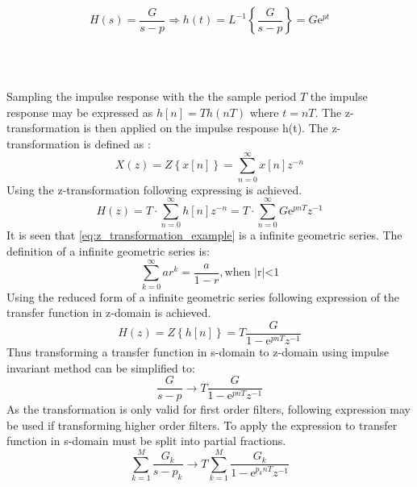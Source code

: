 \begin{equation}
H(s) = \frac{G}{s-p} \Rightarrow h(t) = L^{-1}\left\lbrace \frac{G}{s-p} \right\rbrace = G\text{e}^{pt}
\end{equation}
\begin{where}
\\
\\
\end{where}

Sampling the impulse response with the the sample period $T$ the impulse response may be expressed as $h[n] = Th(nT)$ where $t = nT$. The z-transformation is then applied on the impulse response h(t). The z-transformation is defined as \citep{Oppenheim}:
\begin{equation}
X(z) = Z \left\lbrace x[n] \right\rbrace = \sum_{n=0}^{\infty}x[n]z^{-n}
\end{equation}
Using the z-transformation following expressing is achieved.
\begin{equation} \label{eq:z_transformation_example}
H(z) = T\cdot \sum_{n=0}^{\infty}h[n]z^{-n} = T\cdot \sum_{n=0}^{\infty}G\text{e}^{pnT}z^{-1}
\end{equation}
It is seen that \autoref{eq:z_transformation_example} is a infinite geometric series. The definition of a infinite geometric series is:
\begin{equation} \label{eq:z_transformation_example}
\sum_{k=0}^{\infty}ar^k  = \frac{a}{1-r}, \text{when |r|<1}
\end{equation}
Using the reduced form of a infinite geometric series following expression of the transfer function in z-domain is achieved.
\begin{equation} \label{eq:z_transformation_example1}
H(z) = Z \left\lbrace h[n] \right\rbrace = T \frac{G}{1-\text{e}^{pnT}z^{-1}}
\end{equation}
Thus transforming a transfer function in s-domain to z-domain using impulse invariant method can be simplified to:
\begin{equation} \label{eq:z_transformation_example2}
\frac{G}{s-p} \rightarrow T\frac{G}{1-\text{e}^{pnT}z^{-1}}
\end{equation}
As the transformation is only valid for first order filters, following expression may be used if transforming higher order filters. To apply the expression to transfer function in s-domain must be split into partial fractions.
\begin{equation} \label{eq:z_transformation_example3}
\sum_{k=1}^{M} \frac{G_k}{s-p_k} \rightarrow T \sum_{k=1}^{M} \frac{G_k}{1-\text{e}^{p_knT}z^{-1}}
\end{equation}

